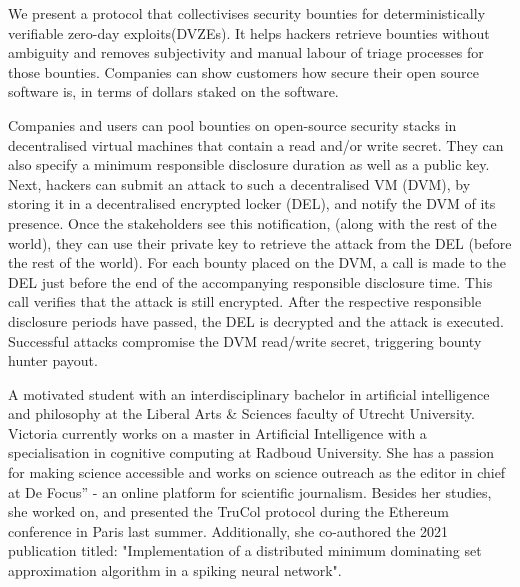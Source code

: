 \documentclass{article}
\begin{document}
We present a protocol that collectivises security bounties for deterministically verifiable zero-day exploits(DVZEs). It helps hackers retrieve bounties without ambiguity and removes subjectivity and manual labour of triage processes for those bounties. Companies can show customers how secure their open source software is, in terms of dollars staked on the software.

Companies and users can pool bounties on open-source security stacks in decentralised virtual machines that contain a read and/or write secret. They can also specify a minimum responsible disclosure duration as well as a public key. Next, hackers can submit an attack to such a decentralised VM (DVM), by storing it in a decentralised encrypted locker (DEL), and notify the DVM of its presence. Once the stakeholders see this notification, (along with the rest of the world), they can use their private key to retrieve the attack from the DEL (before the rest of the world). For each bounty placed on the DVM, a call is made to the DEL just before the end of the accompanying responsible disclosure time. This call verifies that the attack is still encrypted. After the respective responsible disclosure periods have passed, the DEL is decrypted and the attack is executed. Successful attacks compromise the DVM read/write secret, triggering bounty hunter payout.


A motivated student with an interdisciplinary bachelor in artificial intelligence and philosophy at the Liberal Arts & Sciences faculty of Utrecht University. Victoria currently works on a master in Artificial Intelligence with a specialisation in cognitive computing at Radboud University. She has a passion for making science accessible and works on science outreach as the editor in chief at De Focus” - an online platform for scientific journalism. Besides her studies, she worked on, and presented the TruCol protocol during the Ethereum conference in Paris last summer. Additionally, she co-authored the 2021 publication titled: "Implementation of a distributed minimum dominating set approximation algorithm in a spiking neural network".
\end{document}

